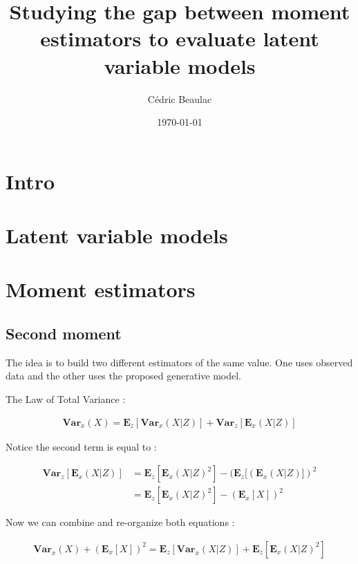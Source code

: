 \documentclass{article}
\newcommand{\Vx}{\textbf{Var}_x}
\newcommand{\Ex}{\textbf{E}_x}
\newcommand{\Vz}{\textbf{Var}_z}
\newcommand{\Ez}{\textbf{E}_z}
\begin{document}
\title{Studying the gap between moment estimators to evaluate latent variable models}



\author{C\'edric Beaulac}


\date{\today}

\maketitle


\section{Intro}

\section{Latent variable models}


\section{Moment estimators}

\subsection{Second moment}

The idea is to build two different estimators of the same value. One uses observed data and the other uses the proposed generative model. 

\bigskip

The Law of Total Variance :


\begin{align}
\Vx(X) = \Ez[\Vx(X|Z)] + \Vz[\Ex(X|Z)]
\end{align}

Notice the second term is equal to :

\begin{align}
\Vz[\Ex(X|Z)] &= \Ez[\Ex(X|Z)^2] - (\Ez[(\Ex(X|Z)])^2 \\
&= \Ez[\Ex(X|Z)^2] - (\Ex[X])^2
\end{align}

Now we can combine and re-organize both equations :

\begin{align}
\Vx(X)+ (\Ex[X])^2 = \Ez[\Vx(X|Z)] + \Ez[\Ex(X|Z)^2]
\label{rhslhs}
\end{align}
\end{document}
